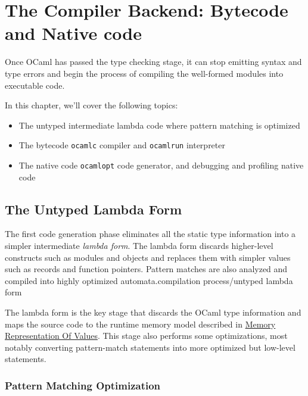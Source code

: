\hypertarget{the-compiler-backend-byte-code-and-native-code}{%
\section{The Compiler Backend: Bytecode and Native
code}\label{the-compiler-backend-byte-code-and-native-code}}

Once OCaml has passed the type checking stage, it can stop emitting
syntax and type errors and begin the process of compiling the
well-formed modules into executable code.

In this chapter, we'll cover the following topics:

\begin{itemize}
\item
  The untyped intermediate lambda code where pattern matching is
  optimized
\item
  The bytecode \passthrough{\lstinline!ocamlc!} compiler and
  \passthrough{\lstinline!ocamlrun!} interpreter
\item
  The native code \passthrough{\lstinline!ocamlopt!} code generator, and
  debugging and profiling native code
\end{itemize}

\hypertarget{the-untyped-lambda-form}{%
\subsection{The Untyped Lambda Form}\label{the-untyped-lambda-form}}

The first code generation phase eliminates all the static type
information into a simpler intermediate \emph{lambda form}. The lambda
form discards higher-level constructs such as modules and objects and
replaces them with simpler values such as records and function pointers.
Pattern matches are also analyzed and compiled into highly optimized
automata.\protect\hypertarget{CPuntype}{}{compilation
process/untyped lambda form}

The lambda form is the key stage that discards the OCaml type
information and maps the source code to the runtime memory model
described in
\href{runtime-memory-layout.html\#memory-representation-of-values}{Memory
Representation Of Values}. This stage also performs some optimizations,
most notably converting pattern-match statements into more optimized but
low-level statements.

\hypertarget{pattern-matching-optimization}{%
\subsubsection{Pattern Matching
Optimization}\label{pattern-matching-optimization}}


